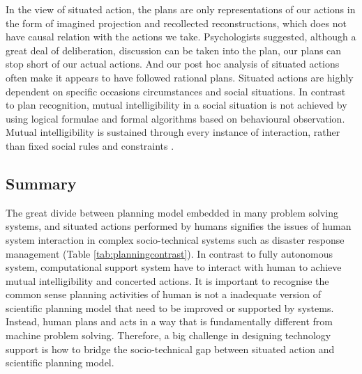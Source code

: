 In the view of situated action, the plans are only representations of our actions in the form of imagined projection and recollected reconstructions, which does not have causal relation with the actions we take. Psychologists \cite{Mead1934} suggested, although a great deal of deliberation, discussion can be taken into the plan, our plans can stop short of our actual actions. And our post hoc analysis of situated actions often make it appears to have followed rational plans. Situated actions are highly dependent on specific occasions circumstances and social situations. In contrast to plan recognition, mutual intelligibility in a social situation is not achieved by using logical formulae and formal algorithms based on behavioural observation.  Mutual intelligibility is sustained through every instance of interaction, rather than fixed social rules and constraints \cite{Suchman1987}.\\


\subsection{Summary}
The great divide between planning model embedded in many problem solving systems, and situated actions performed by humans signifies the issues of human system interaction in complex socio-technical systems such as disaster response management (Table \ref{tab:planningcontrast}). In contrast to fully autonomous system, computational support system have to interact with human to achieve mutual intelligibility and concerted actions. It is important to recognise the common sense planning activities of human is not a inadequate version of scientific planning model that need to be improved or supported by systems. Instead, human plans and acts in a way that is fundamentally different from machine problem solving. Therefore, a big challenge in designing technology support is how to bridge the socio-technical gap between situated action and scientific planning model.\\

